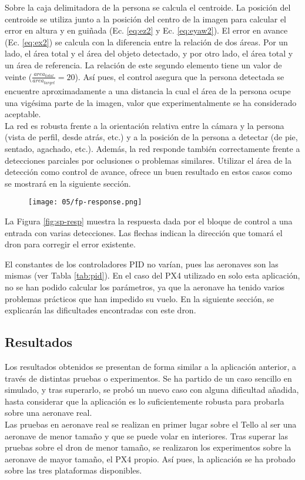 \documentclass[../main.tex]{subfiles}
\begin{document}
Sobre la caja delimitadora de la persona se calcula el centroide. La posición del centroide se utiliza junto a la posición del centro de la imagen para calcular el error en altura y en guiñada (Ec. \ref{eq:ez2} y Ec. \ref{eq:eyaw2}). El error en avance (Ec. \ref{eq:ex2}) se calcula con la diferencia entre la relación de dos áreas. Por un lado, el área total y el área del objeto detectado, y por otro lado, el área total y un área de referencia. La relación de este segundo elemento tiene un valor de veinte ($\frac{area_{total}}{area_{target}} = 20$). Así pues, el control asegura que la persona detectada se encuentre aproximadamente a una distancia la cual el área de la persona ocupe una vigésima parte de la imagen, valor que experimentalmente se ha considerado aceptable. \\
La red es robusta frente a la orientación relativa entre la cámara y la persona (vista de perfil, desde atrás, etc.) y a la posición de la persona a detectar (de pie, sentado, agachado, etc.). Además, la red responde también correctamente frente a detecciones parciales por oclusiones o problemas similares. Utilizar el área de la detección como control de avance, ofrece un buen resultado en estos casos como se mostrará en la siguiente sección.

\begin{figure}[!ht]
 	{\texttt{[image: 05/fp-response.png]}}
\end{figure}

La Figura \ref{fig:sp-resp} muestra la respuesta dada por el bloque de control a una entrada con varias detecciones. Las flechas indican la dirección que tomará el dron para corregir el error existente.

El constantes de los controladores PID no varían, pues las aeronaves son las mismas (ver Tabla \ref{tab:pid}). En el caso del PX4 utilizado en solo esta aplicación, no se han podido calcular los parámetros, ya que la aeronave ha tenido varios problemas prácticos que han impedido su vuelo. En la siguiente sección, se explicarán las dificultades encontradas con este dron.

\subsection*{Resultados}
Los resultados obtenidos se presentan de forma similar a la aplicación anterior, a través de distintas pruebas o experimentos. Se ha partido de un caso sencillo en simulado, y tras superarlo, se probó un nuevo caso con alguna dificultad añadida, hasta considerar que la aplicación es lo suficientemente robusta para probarla sobre una aeronave real. \\
Las pruebas en aeronave real se realizan en primer lugar sobre el Tello al ser una aeronave de menor tamaño y que se puede volar en interiores. Tras superar las pruebas sobre el dron de menor tamaño, se realizaron los experimentos sobre la aeronave de mayor tamaño, el PX4 propio. Así pues, la aplicación se ha probado sobre las tres plataformas disponibles.
\end{document}
